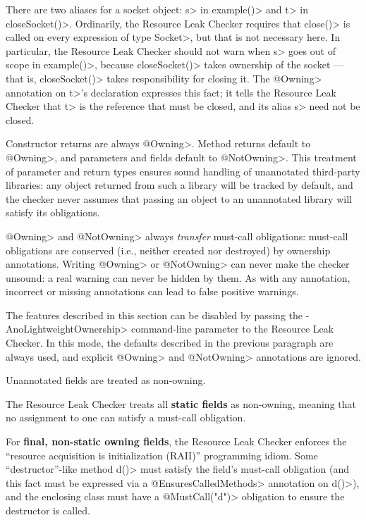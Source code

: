 There are two aliases for a socket object: \<s> in \<example()> and \<t> in
\<closeSocket()>.  Ordinarily, the Resource Leak Checker requires that
\<close()> is called on every expression of type \<Socket>, but that is not
necessary here.  In particular, the Resource Leak Checker should not warn when
\<s> goes out of scope in \<example()>, because \<closeSocket()> takes ownership
of the socket --- that is, \<closeSocket()> takes responsibility for closing
it. The \<@Owning> annotation on \<t>'s declaration expresses this fact; it
tells the Resource Leak Checker that \<t> is the reference that must be
closed, and its alias \<s> need not be closed.

Constructor returns are always \<@Owning>.
Method returns default to \<@Owning>,
and parameters and fields default to \<@NotOwning>. This treatment of parameter and
return types ensures sound handling of unannotated third-party libraries: any
object returned from such a library will be tracked by default, and the checker
never assumes that passing an object to an unannotated library will satisfy its obligations.

\<@Owning> and \<@NotOwning> always \emph{transfer} must-call obligations: must-call
obligations are conserved (i.e., neither created nor destroyed) by ownership annotations.
Writing \<@Owning> or \<@NotOwning> can never make the checker
unsound:  a real warning can never be hidden by them.
As with any annotation, incorrect or missing annotations can lead to false positive warnings.

The features described in this section can be disabled by passing the \<-AnoLightweightOwnership>
command-line parameter to the Resource Leak Checker.
In this mode, the defaults described in the previous paragraph are always used, and explicit \<@Owning>
and \<@NotOwning> annotations are ignored.



Unannotated fields are treated as non-owning.

The Resource Leak Checker treats all \textbf{static fields} as non-owning, meaning that no assignment to one
can satisfy a must-call obligation.

For \textbf{final, non-static owning fields},
the Resource Leak Checker enforces the ``resource acquisition is
initialization (RAII)'' programming idiom.  Some
``destructor''-like method \<d()> must satisfy the field's must-call obligation
(and this fact must be expressed via a \<@EnsuresCalledMethods> annotation on \<d()>),
and the enclosing class must have a \<@MustCall("d")> obligation to
ensure the destructor is called.


